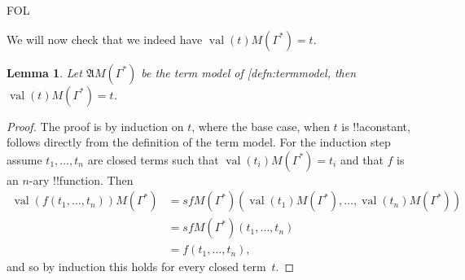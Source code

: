 \documentclass[10pt,a4paper]{article}
\makeatletter
\theoremstyle{plain}
\newtheorem{lem}[thm]{Lemma}
\theoremstyle{definition}
\theoremstyle{remark}
\newcommand*{\ollabel}[1]{\label{#1}}
\newcommand{\olref}{\@ifnextchar[{\olref@i}{\olref@final}}
\def\olref@i[#1]{\@ifnextchar[{\olref@ii}{\olref@final}}
\def\olref@ii[#1]{\@ifnextchar[{\olref@iii}{\olref@final}}
\def\olref@iii[#1]{\olref@final}
\def\olref@final#1{\ref{#1}}
\providecommand{\Struct}{\ensuremath{\mathfrak{A}}}
\providecommand{\Assign}{\ensuremath{s}}
\providecommand{\iftag}[1]{#1}
\providecommand{\Value}[1]{\operatorname{val}(#1)}
\makeatother
\begin{document}
\iftag{FOL}{%
We will now check that we indeed have $\Value{t}{M(\Gamma^*)} = t$.

\begin{lem} 
\ollabel{lem:val-in-termmodel} Let $\Struct M(\Gamma^*)$ be the term model
of \olref{defn:termmodel}, then $\Value{t}{M(\Gamma^*)} = t$.
\end{lem}
\begin{proof} 
 The proof is by induction on $t$, where the base case, when $t$
 is !!a{constant}, follows directly from the definition of the term
 model. For the induction step assume $t_1, \ldots, t_n$ are closed terms
 such that $\Value{t_i}{M(\Gamma^*)} = t_i$ and that $f$ is an $n$-ary
 !!{function}. Then 
\begin{align*}
\Value{f(t_1,\ldots,t_n)}{M(\Gamma^*)} &= \Assign{f}{M(\Gamma^*)}(\Value{t_1}
 {M(\Gamma^*)}, 
\ldots, \Value{t_n}{M(\Gamma^*)}) \\
&= \Assign{f}{M(\Gamma^*)}(t_1, \dots, t_n) \\
&= f(t_1,\dots, t_n),
\end{align*} 
and so by induction this holds for every closed term~$t$.
\end{proof}
}
\end{document}
